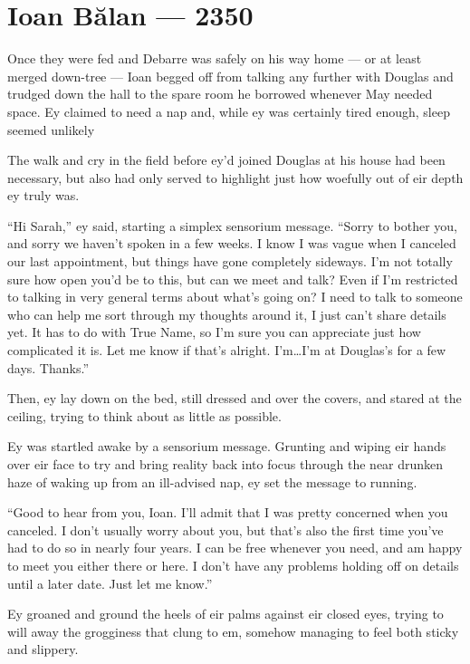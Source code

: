 \hypertarget{ioan-bux103lan-2350}{%
\chapter{Ioan Bălan — 2350}\label{ioan-bux103lan-2350}}

Once they were fed and Debarre was safely on his way home — or at least merged down-tree — Ioan begged off from talking any further with Douglas and trudged down the hall to the spare room he borrowed whenever May needed space. Ey claimed to need a nap and, while ey was certainly tired enough, sleep seemed unlikely

The walk and cry in the field before ey'd joined Douglas at his house had been necessary, but also had only served to highlight just how woefully out of eir depth ey truly was.

``Hi Sarah,'' ey said, starting a simplex sensorium message. ``Sorry to bother you, and sorry we haven't spoken in a few weeks. I know I was vague when I canceled our last appointment, but things have gone completely sideways. I'm not totally sure how open you'd be to this, but can we meet and talk? Even if I'm restricted to talking in very general terms about what's going on? I need to talk to someone who can help me sort through my thoughts around it, I just can't share details yet. It has to do with True Name, so I'm sure you can appreciate just how complicated it is. Let me know if that's alright. I'm\ldots I'm at Douglas's for a few days. Thanks.''

Then, ey lay down on the bed, still dressed and over the covers, and stared at the ceiling, trying to think about as little as possible.

Ey was startled awake by a sensorium message. Grunting and wiping eir hands over eir face to try and bring reality back into focus through the near drunken haze of waking up from an ill-advised nap, ey set the message to running.

``Good to hear from you, Ioan. I'll admit that I was pretty concerned when you canceled. I don't usually worry about you, but that's also the first time you've had to do so in nearly four years. I can be free whenever you need, and am happy to meet you either there or here. I don't have any problems holding off on details until a later date. Just let me know.''

Ey groaned and ground the heels of eir palms against eir closed eyes, trying to will away the grogginess that clung to em, somehow managing to feel both sticky and slippery.

